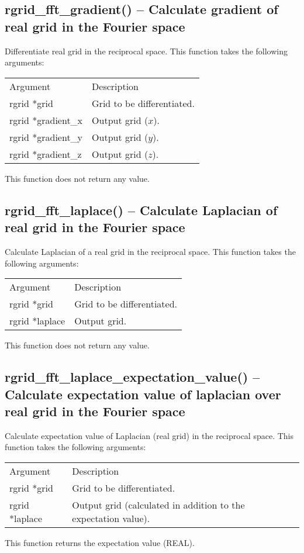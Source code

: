 \documentclass[12pt,letterpaper]{report}
\begin{document}
\subsection{rgrid\_fft\_gradient() -- Calculate gradient of real grid in the Fourier space}

Differentiate real grid in the reciprocal space. This function takes the following arguments:
\begin{longtable}{p{} p{}}
Argument & Description\\
\cline{1-2}
rgrid *grid & Grid to be differentiated.\\
rgrid *gradient\_x & Output grid ($x$).\\
rgrid *gradient\_y & Output grid ($y$).\\
rgrid *gradient\_z & Output grid ($z$).\\
\end{longtable}
\noindent
This function does not return any value.

\subsection{rgrid\_fft\_laplace() -- Calculate Laplacian of real grid in the Fourier space}

Calculate Laplacian of a real grid in the reciprocal space. This function takes the following arguments:
\begin{longtable}{p{} p{}}
Argument & Description\\
\cline{1-2}
rgrid *grid & Grid to be differentiated.\\
rgrid *laplace & Output grid.\\
\end{longtable}
\noindent
This function does not return any value.

\subsection{rgrid\_fft\_laplace\_expectation\_value() -- Calculate expectation value of laplacian over real grid in the Fourier space}

Calculate expectation value of Laplacian (real grid) in the reciprocal space. This function takes the following arguments:
\begin{longtable}{p{} p{}}
Argument & Description\\
\cline{1-2}
rgrid *grid & Grid to be differentiated.\\
rgrid *laplace & Output grid (calculated in addition to the expectation value).\\
\end{longtable}
\noindent
This function returns the expectation value (REAL).
\end{document}
